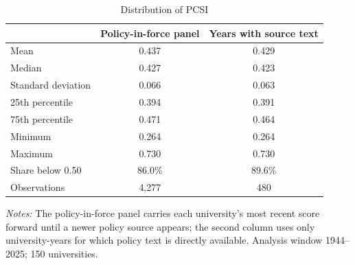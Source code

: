 \begin{table}[htbp]
\centering
\small
\caption{Distribution of PCSI}
\label{tab:dist}
\begin{threeparttable}
\begin{tabular}{lcc}
\toprule
 & Policy-in-force panel & Years with source text \\
\midrule
Mean & 0.437 & 0.429 \\
Median & 0.427 & 0.423 \\
Standard deviation & 0.066 & 0.063 \\
25th percentile & 0.394 & 0.391 \\
75th percentile & 0.471 & 0.464 \\
Minimum & 0.264 & 0.264 \\
Maximum & 0.730 & 0.730 \\
Share below 0.50 & 86.0\% & 89.6\% \\
\midrule
Observations & 4,277 & 480 \\
\bottomrule
\end{tabular}
\begin{tablenotes}[flushleft]\footnotesize
\item \textit{Notes:} The policy-in-force panel carries each university's most recent score forward until a newer policy source appears; the second column uses only university-years for which policy text is directly available. Analysis window 1944--2025; 150 universities.
\end{tablenotes}
\end{threeparttable}
\end{table}
